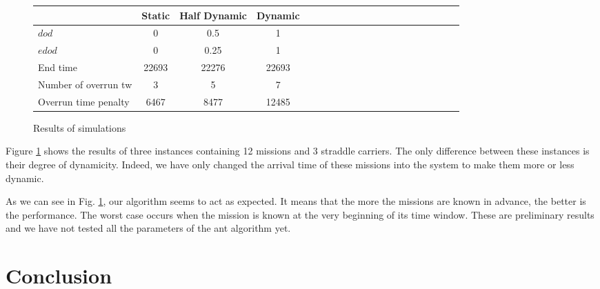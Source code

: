 \documentclass[journal]{IEEEtran}
\let\MYoriglatexcaption\caption
\renewcommand{\caption}[2][\relax]{\MYoriglatexcaption[#2]{#2}}
\begin{document}
\begin{figure}
 	\begin{center}
	\begin{tabular}{*{5}{|l|c|c|c}}
		\hline
						& Static& Half Dynamic & Dynamic \\
		\hline
		$dod$				& 0 	&0.5 	& 1 	 \\
		$edod$				& 0 	&0.25	& 1 	\\
		\hline
		End time 			&22693	& 22276	& 22693   \\
		\hline		
		Number of overrun tw		&3	&5 	& 7 \\
		\hline		
		Overrun time penalty		&6467	&8477	& 12485\\
		\hline
	
	\end{tabular}
	

	\end{center}
	\caption{Results of simulations}
	\label{results}
 
\end{figure}

Figure \ref{results} shows the results of three instances containing 12 missions and 3 straddle carriers. The only difference between these instances is their degree of dynamicity. Indeed, we have only changed the arrival time of these missions into the system to make them more or less dynamic.

As we can see in Fig. \ref{results}, our algorithm seems to act as expected. It means that the more the missions are known in advance, the better is the performance. The worst case occurs when the mission is known at the very beginning of its time window. These are preliminary results and we have not tested all the parameters of the ant algorithm yet.

\section{Conclusion}
\end{document}
